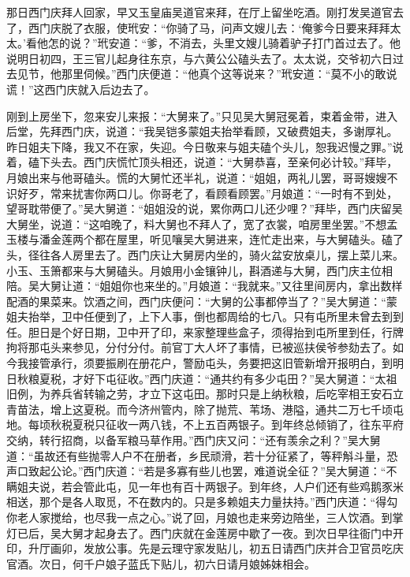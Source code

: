 那日西门庆拜人回家，早又玉皇庙吴道官来拜，在厅上留坐吃酒。刚打发吴道官去了，西门庆脱了衣服，使玳安：“你骑了马，问声文嫂儿去：‘俺爹今日要来拜拜太太。’看他怎的说？”玳安道：“爹，不消去，头里文嫂儿骑着驴子打门首过去了。他说明日初四，王三官儿起身往东京，与六黄公公磕头去了。太太说，交爷初六日过去见节，他那里伺候。”西门庆便道：“他真个这等说来？”玳安道：“莫不小的敢说谎！”这西门庆就入后边去了。

刚到上房坐下，忽来安儿来报：“大舅来了。”只见吴大舅冠冕着，束着金带，进入后堂，先拜西门庆，说道：“我吴铠多蒙姐夫抬举看顾，又破费姐夫，多谢厚礼。昨日姐夫下降，我又不在家，失迎。今日敬来与姐夫磕个头儿，恕我迟慢之罪。”说着，磕下头去。西门庆慌忙顶头相还，说道：“大舅恭喜，至亲何必计较。”拜毕，月娘出来与他哥磕头。慌的大舅忙还半礼，说道：“姐姐，两礼儿罢，哥哥嫂嫂不识好歹，常来扰害你两口儿。你哥老了，看顾看顾罢。”月娘道：“一时有不到处，望哥耽带便了。”吴大舅道：“姐姐没的说，累你两口儿还少哩？”拜毕，西门庆留吴大舅坐，说道：“这咱晚了，料大舅也不拜人了，宽了衣裳，咱房里坐罢。”不想孟玉楼与潘金莲两个都在屋里，听见嚷吴大舅进来，连忙走出来，与大舅磕头。磕了头，径往各人房里去了。西门庆让大舅房内坐的，骑火盆安放桌儿，摆上菜儿来。小玉、玉箫都来与大舅磕头。月娘用小金镶钟儿，斟酒递与大舅，西门庆主位相陪。吴大舅让道：“姐姐你也来坐的。”月娘道：“我就来。”又往里间房内，拿出数样配酒的果菜来。饮酒之间，西门庆便问：“大舅的公事都停当了？”吴大舅道：“蒙姐夫抬举，卫中任便到了，上下人事，倒也都周给的七八。只有屯所里未曾去到到任。胆日是个好日期，卫中开了印，来家整理些盒子，须得抬到屯所里到任，行牌拘将那屯头来参见，分付分付。前官丁大人坏了事情，已被巡扶侯爷参劾去了。如今我接管承行，须要振刷在册花户，警励屯头，务要把这旧管新增开报明白，到明日秋粮夏税，才好下屯征收。”西门庆道：“通共约有多少屯田？”吴大舅道：“太祖旧例，为养兵省转输之劳，才立下这屯田。那时只是上纳秋粮，后吃宰相王安石立青苗法，增上这夏税。而今济州管内，除了抛荒、苇场、港隘，通共二万七千顷屯地。每顷秋税夏税只征收一两八钱，不上五百两银子。到年终总倾销了，往东平府交纳，转行招商，以备军粮马草作用。”西门庆又问：“还有羡余之利？”吴大舅道：“虽故还有些抛零人户不在册者，乡民顽滑，若十分征紧了，等秤斛斗量，恐声口致起公论。”西门庆道：“若是多寡有些儿也罢，难道说全征？”吴大舅道：“不瞒姐夫说，若会管此屯，见一年也有百十两银子。到年终，人户们还有些鸡鹅豕米相送，那个是各人取觅，不在数内的。只是多赖姐夫力量扶持。”西门庆道：“得勾你老人家搅给，也尽我一点之心。”说了回，月娘也走来旁边陪坐，三人饮酒。到掌灯已后，吴大舅才起身去了。西门庆就在金莲房中歇了一夜。到次日早往衙门中开印，升厅画卯，发放公事。先是云理守家发贴儿，初五日请西门庆并合卫官员吃庆官酒。次日，何千户娘子蓝氏下贴儿，初六日请月娘姊妹相会。

